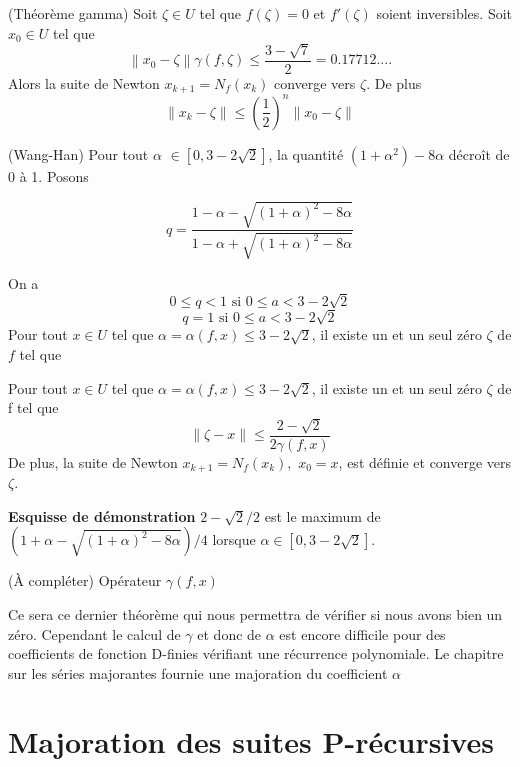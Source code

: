\documentclass[a4paper,10.5pt]{article}
\begin{document}
	\begin{theorem}(Théorème gamma) Soit $\zeta \in U$ tel que $f(\zeta)=0$ et $f'(\zeta)$ soient inversibles. Soit $x_{0} \in U$ tel que \\
		\[\left\|x_{0}-\zeta\right\|\gamma(f,\zeta) \leq \frac{3-\sqrt{7}}{2}=0.17712.... \]
		Alors la suite de Newton $x_{k+1}=N_{f}(x_{k})$ converge vers $\zeta$. De plus\\
		\[\left\|x_{k}-\zeta\right\| \leq \left(\frac{1}{2}\right)^{n}\left\|x_{0}-\zeta\right\|\]
	\end{theorem}
	
	
	\begin{theorem}(Wang-Han)
		Pour tout $\alpha$ $\in [0,3-2\sqrt{2}]$, la quantité $(1+\alpha^{2})-8\alpha$ décroît de 0 à 1. Posons
		
		\[q=\frac{1-\alpha-\sqrt{(1+\alpha)^{2}-8\alpha}}{1-\alpha+\sqrt{(1+\alpha)^{2}-8\alpha}}\]
		
		On a
		\[0 \leq q<1 \text{ si } 0 \leq a < 3-2\sqrt{2}\]
		\[q=1        \text{ si } 0 \leq a < 3-2\sqrt{2}\]
		Pour tout $x\in U$ tel que $\alpha=\alpha(f,x) \leq 3-2\sqrt{2}$, il existe un et un seul zéro $\zeta$ de $f$ tel que\\
	\end{theorem}
	
	
	\begin{corollaire}
		Pour tout $x\in U$ tel que $\alpha=\alpha(f,x) \leq 3-2\sqrt{2}$, il existe un et un seul zéro $\zeta$ de f tel que
		\[\left\|\zeta-x\right\|\leq\frac{2-\sqrt{2}}{2\gamma(f,x)}\]
		De plus, la suite de Newton $x_{k+1}=N_{f}(x_{k}),$ $x_{0}=x$, est définie et converge vers $\zeta$.
	\end{corollaire}
	\noindent \textbf{Esquisse de démonstration} $2-\sqrt2/2$ est le maximum de $(1+\alpha-\sqrt{(1+\alpha)^{2}-8\alpha})/4$ lorsque $\alpha \in [0,3-2\sqrt2]$.
	
	(À compléter)
	\noindent Opérateur $\gamma(f,x)$
	
	Ce sera ce dernier théorème qui nous permettra de vérifier si nous avons bien un zéro. Cependant le calcul de $\gamma$ et donc de $\alpha$ est encore difficile pour des coefficients de fonction D-finies vérifiant une récurrence polynomiale. Le chapitre sur les séries majorantes fournie une majoration du coefficient $\alpha$
	
	
	
	
	\section{Majoration des suites P-récursives}
	
\end{document}
